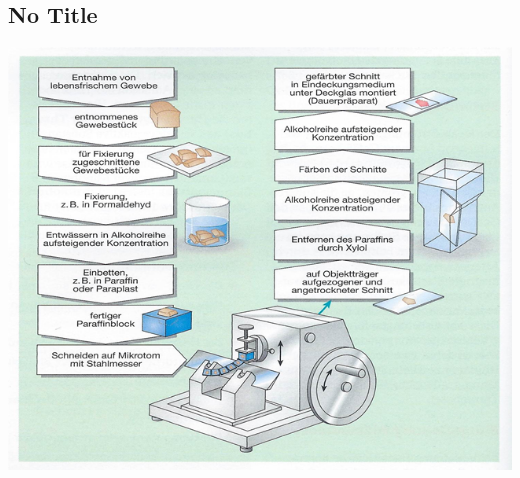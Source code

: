 \begin{it>emize}
\subsection{No Title}
\includegraphics{klin.med.-grundlagen-img0000.png}


\end{it>emize}
